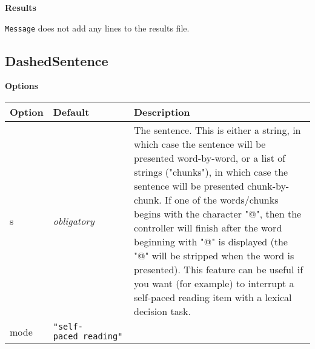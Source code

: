 \documentclass[
]{article}
\begin{document}
\textbf{Results}

\texttt{Message} does not add any lines to the results file.

\hypertarget{dashedsentence}{%
\subsection{DashedSentence}\label{dashedsentence}}

\textbf{Options}

\begin{RaggedRight}\small\begin{longtable}[]{p{1.7in}p{1in}p{3.15in}}
\toprule
\begin{minipage}[b]{0.15\columnwidth}\raggedright
\textbf{Option}\strut
\end{minipage} & \begin{minipage}[b]{0.22\columnwidth}\raggedright
\textbf{Default}\strut
\end{minipage} & \begin{minipage}[b]{0.54\columnwidth}\raggedright
\textbf{Description}\strut
\end{minipage}\tabularnewline
\midrule
\endhead
\begin{minipage}[t]{0.15\columnwidth}\raggedright
s\strut
\end{minipage} & \begin{minipage}[t]{0.22\columnwidth}\raggedright
\emph{obligatory}\strut
\end{minipage} & \begin{minipage}[t]{0.54\columnwidth}\raggedright
The sentence. This is either a string, in which case the sentence will
be presented word-by-word, or a list of strings ("chunks"), in which
case the sentence will be presented chunk-by-chunk. If one of the
words/chunks begins with the character "@", then the controller will
finish after the word beginning with "@" is displayed (the "@" will be
stripped when the word is presented). This feature can be useful if you
want (for example) to interrupt a self-paced reading item with a lexical
decision task.\strut
\end{minipage}\tabularnewline
\begin{minipage}[t]{0.15\columnwidth}\raggedright
mode\strut
\end{minipage} & \begin{minipage}[t]{0.22\columnwidth}\raggedright
\texttt{"self-paced\ reading"}\strut
\end{minipage} & \begin{minipage}[t]{0.54\columnwidth}\raggedright

\end{minipage}
\end{longtable}
\end{RaggedRight}
\end{document}
